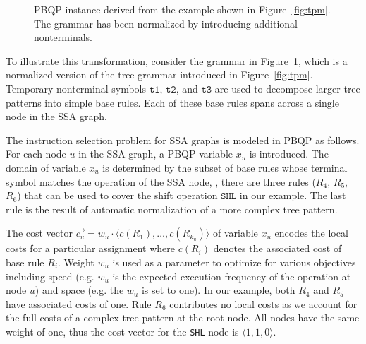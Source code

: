 \begin{figure}
\begin{center}
  \end{center}
  \caption{PBQP instance derived from the example shown in
    Figure~\ref{fig:tpm}. The grammar has been normalized by
    introducing additional nonterminals.}\label{fig:pbpq-example}
\end{figure}

To illustrate this transformation, consider the grammar in
Figure~\ref{fig:pbpq-example}, which is a normalized version of the
tree grammar introduced in Figure~\ref{fig:tpm}. Temporary nonterminal
symbols $\texttt{t1}$, $\texttt{t2}$, and $\texttt{t3}$ are used to
decompose larger tree patterns into simple base rules. Each of these
base rules spans across a single node in the SSA graph.

The instruction selection problem for SSA graphs is modeled in PBQP as
follows. For each node $u$ in the SSA graph, a PBQP variable $x_u$ is
introduced. The domain of variable $x_u$ is determined by the subset
of base rules whose terminal symbol matches the operation of the SSA
node, \eg, there are three rules ($R_4$, $R_5$, $R_6$) that can be
used to cover the shift operation $\texttt{SHL}$ in our example. The
last rule is the result of automatic normalization of a more complex
tree pattern.

The cost vector $\vec{c_u}= w_u \cdot \langle c(R_1), \dots,
c(R_{k_u}) \rangle$ of variable $x_u$ encodes the local costs for a
particular assignment where $c(R_i)$ denotes the associated cost of
base rule $R_i$. Weight $w_u$ is used as a parameter to optimize for
various objectives including speed (e.g. $w_u$ is the expected
execution frequency of the operation at node $u$) and space (e.g. the
$w_u$ is set to one). In our example, both $R_4$ and $R_5$ have
associated costs of one. Rule $R_6$ contributes no local costs as we
account for the full costs of a complex tree pattern at the root
node. All nodes have the same weight of one, thus the cost vector for
the \texttt{SHL} node is $\langle1, 1, 0 \rangle$.

